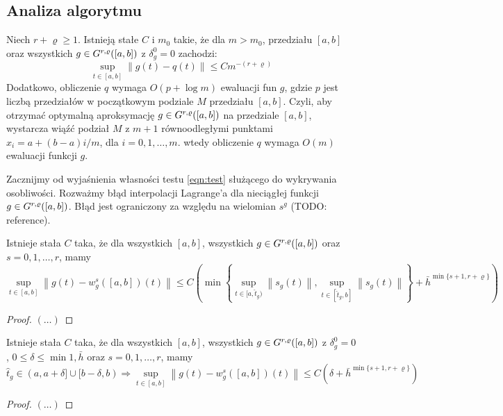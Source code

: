 \documentclass[oik, pdftex, robocza, man]{mgrwms}
\begin{document}
\begin{tabular}{p{0.045\linewidth} p{0.85\linewidth}}
\end{tabular} \vspace{10pt}

\subsection{Analiza algorytmu}

\begin{thm}
    \label{2014_tw1}
    Niech $r+\varrho \geq 1$. Istnieją stałe $C$ i $m_{0}$ takie, że dla $m>m_{0}$, przedziału $[a,b]$ oraz wszystkich $g \in G^{r,\varrho}([a,b])$ z $\delta_{g}^{0} = 0$ zachodzi:
    \begin{equation*}
        \sup_{t \in [a,b]} \| g(t) - q(t) \| \leq Cm^{-(r+\varrho)}
    \end{equation*}
    Dodatkowo, obliczenie $q$ wymaga $O(p+\log m)$ ewaluacji fun $g$, gdzie $p$ jest liczbą przedziałów w początkowym podziale $M$ przedziału $[a,b]$. Czyli, aby otrzymać optymalną aproksymację $g \in G^{r,\varrho}([a,b])$ na przedziale $[a,b]$, wystarcza wiąźć podział $M$ z $m+1$ równoodległymi punktami $x_{i} = a+(b-a)i/m$, dla $i=0,1,\dots,m$. wtedy obliczenie $q$ wymaga $O(m)$ ewaluacji funkcji $g$.
\end{thm}

Zacznijmy od wyjaśnienia własności testu \ref{eqn:test} służącego do wykrywania osobliwości. Rozważmy błąd interpolacji Lagrange'a dla nieciągłej funkcji $g \in G^{r,\varrho}([a,b])$. Błąd jest ograniczony za względu na wielomian $s^{g}$ (TODO: reference).

\begin{lemma}
    Istnieje stała $C$ taka, że dla wszystkich $[a,b]$, wszystkich $g \in G^{r,\varrho}([a,b])$ oraz $s=0,1,\dots,r$, mamy
    \begin{equation*}
        \sup _{t \in[a, b]}\left\|g(t)-w_{g}^{s}([a, b])(t)\right\| \leq C\left(\min \left\{\sup_{t \in[a, \hat{t}_{g})}\left\|s_{g}(t)\right\|, \sup _{t \in [\hat{t}_{g}, b]}\left\|s_{g}(t)\right\|\right\}+\bar{h}^{\min \{s+1, r+\varrho\}}\right)
    \end{equation*}
\end{lemma}
\begin{proof}
    $(\dots)$
\end{proof}

\begin{cor}
    Istnieje stała $C$ taka, że dla wszystkich $[a,b]$, wszystkich $g \in G^{r,\varrho}([a,b])$ z $\delta_{g}^{0} = 0$, $0 \leq \delta \leq \min{1, \bar{h}}$ oraz $s=0,1,\dots,r$, mamy
    \begin{equation*}
        \hat{t}_{g} \in(a, a+\delta] \cup[b-\delta, b) \Longrightarrow  \sup_{t \in[a, b]}\left\|g(t)-w_{g}^{s}([a, b])(t)\right\| \leq C\left(\delta+\bar{h}^{\min \{s+1, r+\varrho\}}\right)
    \end{equation*}
\end{cor}
\begin{proof}
    $(\dots)$
\end{proof}
\end{document}
